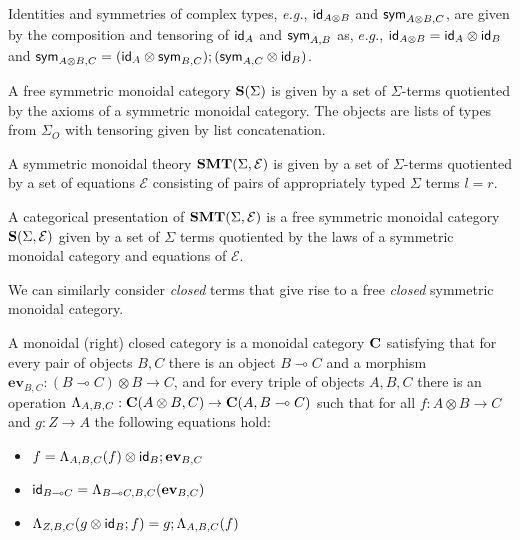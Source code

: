 Identities and symmetries of complex types, \textit{e.g.}, $\textsf{id}_{A \otimes B}$ and $\textsf{sym}_{A \otimes B, C}$, are given by the composition and tensoring of $\textsf{id}_{A}$ and $\textsf{sym}_{A,B}$ as, $\textit{e.g.}$, $\textsf{id}_{A \otimes B} = \textsf{id}_{A} \otimes \textsf{id}_{B}$ and $\textsf{sym}_{A \otimes B, C} = (\textsf{id}_{A} \otimes \textsf{sym}_{B,C});(\textsf{sym}_{A,C} \otimes \textsf{id}_{B})$.

\begin{definition}
	A free symmetric monoidal category $\mathbf{S}(\Sigma)$ is given by a set of $\Sigma$-terms quotiented by the axioms of a symmetric monoidal category.
	The objects are lists of types from $\Sigma_{O}$ with tensoring given by list concatenation.
\end{definition}

\begin{definition}
	A symmetric monoidal theory $\mathbf{SMT}(\Sigma, \mathcal{E})$ is given by a set of $\Sigma$-terms quotiented by a set of equations $\mathcal{E}$ consisting of pairs of appropriately typed $\Sigma$ terms $l = r$.
\end{definition}

\begin{definition}
	A categorical presentation of  $\mathbf{SMT}(\Sigma, \mathcal{E})$ is a free symmetric monoidal category $\mathbf{S}(\Sigma, \mathcal{E})$ given by a set of $\Sigma$ terms quotiented by the laws of a symmetric monoidal category and equations of $\mathcal{E}$.
\end{definition}

We can similarly consider \textit{closed} terms that give rise to a free \textit{closed} symmetric monoidal category.

\begin{definition}
	\label{def:closed}
	A monoidal (right) closed category is a monoidal category $\mathbf{C}$ satisfying that for
	every pair of objects $B,C$ there is an object $B \multimap C$ and a morphism $\textbf{ev}_{B,C} : (B \multimap C) \otimes B \to
		C$, and for every triple of objects $A,B,C$ there is an operation $\Lambda_{A,B,C} : \mathbf{C}(A \otimes B,C) \to
		\mathbf{C}(A,B \multimap{} C)$ such that for all $f : A \otimes B \to C$ and $g : Z \to A$ the following equations hold:
	\begin{itemize}
		\item $f = \Lambda_{A,B,C}(f) \otimes \textsf{id}_{B}; \textbf{ev}_{B,C}$
		\item $\textsf{id}_{B \multimap{} C} = \Lambda_{B \multimap{} C,B,C}(\textbf{ev}_{B,C})$
		\item $\Lambda_{Z,B,C}(g \otimes \textsf{id}_{B}; f) = g;\Lambda_{A,B,C}(f)$
	\end{itemize}
\end{definition}

